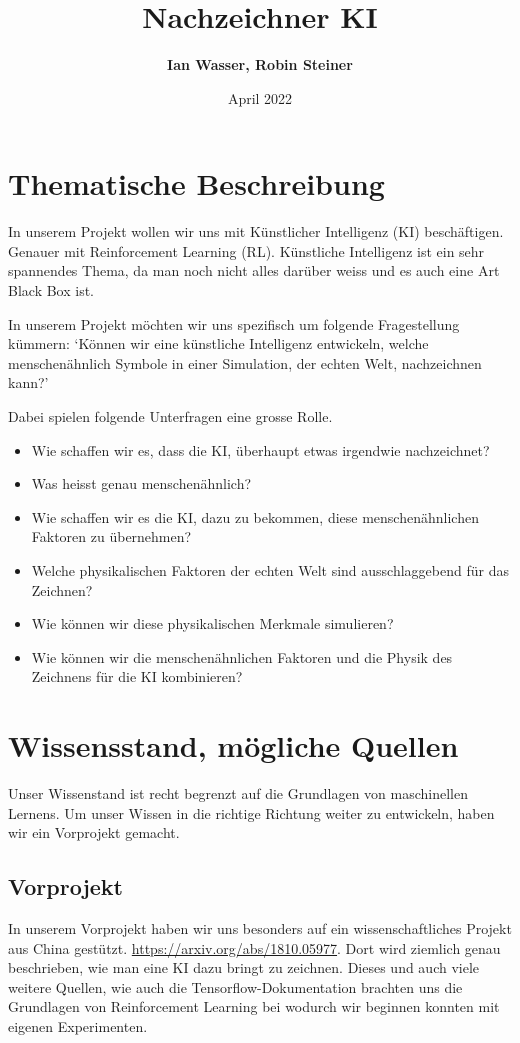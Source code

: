 \documentclass{article}
\title{\textbf{Nachzeichner KI}}
\author{\textbf{Ian Wasser, Robin Steiner}}
\date{April 2022}
\begin{document}
\maketitle

\tableofcontents

\pagebreak

\section{Thematische Beschreibung}
\label{chap:thematische-beschreibung}
In unserem Projekt wollen wir uns mit Künstlicher Intelligenz (KI) beschäftigen.
Genauer mit Reinforcement Learning (RL). Künstliche Intelligenz ist ein sehr
spannendes Thema, da man noch nicht alles darüber weiss und es auch eine Art
Black Box ist.

In unserem Projekt möchten wir uns spezifisch um folgende Fragestellung kümmern:
`Können wir eine künstliche Intelligenz entwickeln, welche menschenähnlich
Symbole in einer Simulation, der echten Welt, nachzeichnen kann?'

Dabei spielen folgende Unterfragen eine grosse Rolle.

\begin{itemize}
    \item Wie schaffen wir es, dass die KI, überhaupt etwas irgendwie nachzeichnet?
    \item Was heisst genau menschenähnlich?
    \item Wie schaffen wir es die KI, dazu zu bekommen, diese menschenähnlichen
    Faktoren zu übernehmen?
    \item Welche physikalischen Faktoren der echten Welt sind ausschlaggebend
    für das Zeichnen?
    \item Wie können wir diese physikalischen Merkmale simulieren?
    \item Wie können wir die menschenähnlichen Faktoren und die Physik des
    Zeichnens für die KI kombinieren?
\end{itemize}

\section{Wissensstand, mögliche Quellen}
\label{chap:wissensstand}

Unser Wissenstand ist recht begrenzt auf die Grundlagen von maschinellen
Lernens. Um unser Wissen in die richtige Richtung weiter zu entwickeln, haben
wir ein Vorprojekt gemacht.

\subsection{Vorprojekt}
In unserem Vorprojekt haben wir uns besonders auf ein wissenschaftliches Projekt
aus China gestützt. \url{https://arxiv.org/abs/1810.05977}. Dort wird ziemlich
genau beschrieben, wie man eine KI dazu bringt zu zeichnen. Dieses und auch
viele weitere Quellen, wie auch die Tensorflow-Dokumentation brachten uns die
Grundlagen von Reinforcement Learning bei wodurch wir beginnen konnten mit
eigenen Experimenten.
\end{document}
